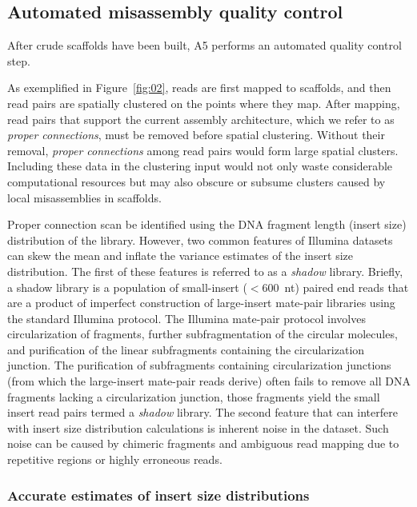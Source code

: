 \documentclass[10pt]{article}
\begin{document}
\subsection*{Automated misassembly quality control}\label{sec:qc}

After crude scaffolds have been built, A5 performs an automated quality control step.

As exemplified in Figure~\ref{fig:02}, reads are first mapped to scaffolds, and then read pairs are spatially clustered on the
points where they map. After mapping, read pairs that support the current assembly architecture, which we 
refer to as \emph{proper connections}, must be removed before spatial clustering. Without their removal, \emph{proper connections}
among read pairs would form large spatial clusters. Including these data in the clustering input would not only waste considerable 
computational resources but may also obscure or subsume clusters caused by local misassemblies in scaffolds. 


Proper connection scan be identified using the DNA fragment length (insert size) distribution of the library. However, two common features of
Illumina datasets can skew the mean and inflate the variance estimates of the insert size distribution. The first of these features is referred 
to as a \emph{shadow} library. Briefly, a shadow library is a population of small-insert ($<$600~nt) paired end reads that are a product of 
imperfect construction of large-insert mate-pair libraries using the standard Illumina protocol. The Illumina mate-pair protocol involves 
circularization of fragments, further subfragmentation of the circular molecules, and purification of the linear subfragments containing the circularization junction. 
The purification of subfragments containing circularization junctions (from which the large-insert mate-pair reads derive) often fails to remove all 
DNA fragments lacking a circularization junction, those fragments yield the small insert read pairs termed a \emph{shadow} library. The second 
feature that can interfere with insert size distribution calculations is inherent noise in the dataset. Such noise can be caused by chimeric 
fragments and ambiguous read mapping due to repetitive regions or highly erroneous reads. 


\subsubsection*{Accurate estimates of insert size distributions}
\end{document}
